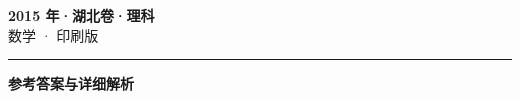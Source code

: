 \documentclass[zihao=5, a4paper]{ctexart}
\begin{document}
\begin{center}
  {\Large\bfseries 2015 年·湖北卷·理科}\\[4pt]
  {\large 数学 · 印刷版}
\end{center}
\medskip
{}

\par\bigskip\hrule\bigskip
{}
\begin{center}{\large\bfseries 参考答案与详细解析}\end{center}
\smallskip

\end{document}
